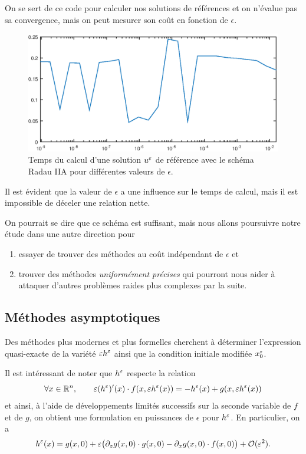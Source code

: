 On se sert de ce code pour calculer nos solutions de références et on n'évalue pas sa convergence, mais on peut mesurer son coût en fonction de $\epsilon$. 
\begin{figure}[!h]
\centering
\includegraphics[width=.8\textwidth]{img/chap1/cost_radau.eps}
\caption{Temps du calcul d'une solution $u^{\varepsilon}$ de référence avec le schéma Radau IIA pour différentes valeurs de $\epsilon$.}
\end{figure}
Il est évident que la valeur de $\epsilon$ a une influence sur le temps de calcul, mais il est impossible de déceler une relation nette. 

On pourrait se dire que ce schéma est suffisant, mais nous allons poursuivre notre étude dans une autre direction pour 
\begin{enumerate}
\item essayer de trouver des méthodes au coût indépendant de $\epsilon$ et
\item trouver des méthodes \textit{uniformément précises} qui pourront nous aider à attaquer d'autres problèmes raides plus complexes par la suite. 
\end{enumerate}


\subsection{Méthodes asymptotiques}

Des méthodes plus modernes et plus formelles cherchent à déterminer l'expression quasi-exacte de la variété $\varepsilon h^{\varepsilon}$ ainsi que la condition initiale modifiée $x_0^{\varepsilon}$. 

Il est intéressant de noter que $h^{\varepsilon}$ respecte la relation 
\begin{equation} \label{eq:formule_variete}
\forall x\in\mathbb{R}^n, \qquad \varepsilon(h^{\varepsilon})'(x)\cdot f(x,\varepsilon h^{\varepsilon}(x)) = - h^{\varepsilon}(x) + g(x,\varepsilon h^{\varepsilon}(x)) 
\end{equation}
et ainsi, à l'aide de développements limités successifs sur la seconde variable de $f$ et de $g$, on obtient une formulation en puissances de $\epsilon$ pour $h^{\varepsilon}$. 
En particulier, on a 
$$ h^{\varepsilon}(x) = g(x,0) + \varepsilon \big(\partial_{z} g(x,0)\cdot g(x,0) - \partial_{x} g(x,0)\cdot f(x,0) \big) + \mathcal{O}(\varepsilon^2). $$

